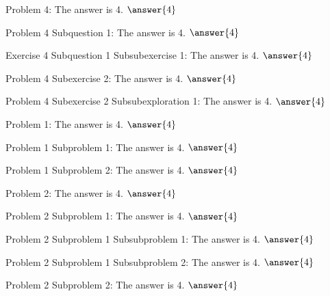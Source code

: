 \documentclass{ximera}
\begin{document}
\begin{problem}\label{problem:4}
    Problem 4: The answer is 4. $\answer{4}$
    \begin{question}
        Problem 4 Subquestion 1: The answer is 4. $\answer{4}$
        \begin{exercise}
            Exercise 4 Subquestion 1 Subsubexercise 1: The answer is 4. $\answer{4}$
        \end{exercise}
    \end{question}
    \begin{exercise}
        Problem 4 Subexercise 2: The answer is 4. $\answer{4}$
        \begin{exploration}
            Problem 4 Subexercise 2 Subsubexploration 1: The answer is 4. $\answer{4}$
        \end{exploration}
    \end{exercise}
\end{problem}

\begin{problem}\label{problem:1}
    \begin{problem}\label{problem:1.1}
        Problem 1: The answer is 4. $\answer{4}$ 
        \begin{problem}\label{problem:1.1.1}
            Problem 1 Subproblem 1: The answer is 4. $\answer{4}$ 
        \end{problem} 
        \begin{problem}\label{problem:1.1.2}
            Problem 1 Subproblem 2: The answer is 4. $\answer{4}$ 
        \end{problem} 
    \end{problem} 
\end{problem} 

\begin{problem}\label{problem:2}
    Problem 2: The answer is 4. $\answer{4}$
    \begin{problem}\label{problem:2.1}
        Problem 2 Subproblem 1: The answer is 4. $\answer{4}$
        \begin{problem}\label{problem:2.1.1}
            Problem 2 Subproblem 1 Subsubproblem 1: The answer is 4. $\answer{4}$
        \end{problem} 
        \begin{problem}\label{problem:2.1.2}
            Problem 2 Subproblem 1 Subsubproblem 2: The answer is 4. $\answer{4}$
        \end{problem} 
    \end{problem} 
    \begin{problem}\label{problem:2.2}
        Problem 2 Subproblem 2: The answer is 4. $\answer{4}$
    \end{problem} 
\end{problem} 
\end{document}

